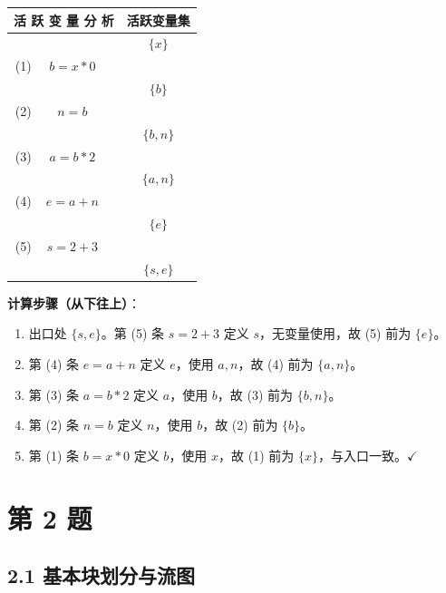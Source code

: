 \documentclass[12pt]{article}
\begin{document}
\begin{center}
\begin{tabular}{rclc}
\toprule
\multicolumn{3}{c}{\textbf{活 跃 变 量 分 析}} & \textbf{活跃变量集} \\
\midrule
    &         &                    & $\{x\}$ \\
(1) & $b = x * 0$  &                   & \\
    &         &                    & $\{b\}$ \\
(2) & $n = b$      &                   & \\
    &         &                    & $\{b, n\}$ \\
(3) & $a = b * 2$  &                   & \\
    &         &                    & $\{a, n\}$ \\
(4) & $e = a + n$  &                   & \\
    &         &                    & $\{e\}$ \\
(5) & $s = 2 + 3$  &                   & \\
    &         &                    & $\{s, e\}$ \\
\bottomrule
\end{tabular}
\end{center}

\textbf{计算步骤（从下往上）}：
\begin{enumerate}
    \item 出口处 $\{s, e\}$。第 (5) 条 $s = 2 + 3$ 定义 $s$，无变量使用，故 (5) 前为 $\{e\}$。
    \item 第 (4) 条 $e = a + n$ 定义 $e$，使用 $a,n$，故 (4) 前为 $\{a, n\}$。
    \item 第 (3) 条 $a = b * 2$ 定义 $a$，使用 $b$，故 (3) 前为 $\{b, n\}$。
    \item 第 (2) 条 $n = b$ 定义 $n$，使用 $b$，故 (2) 前为 $\{b\}$。
    \item 第 (1) 条 $b = x * 0$ 定义 $b$，使用 $x$，故 (1) 前为 $\{x\}$，与入口一致。$\checkmark$
\end{enumerate}

\section*{第 2 题}

\subsection*{2.1 基本块划分与流图}
\end{document}
